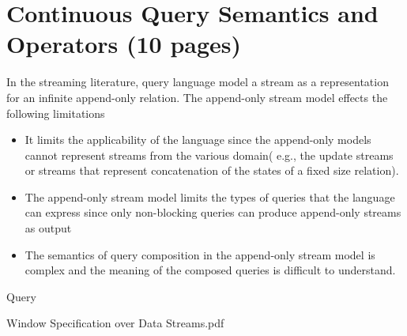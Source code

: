 
\chapter{Continuous Query Semantics and Operators (10 pages)}

\ifpdf
    \graphicspath{{Chapter4/Figs/Raster/}{Chapter4/Figs/PDF/}{Chapter4/Figs/}}
\else
    \graphicspath{{Chapter4/Figs/Vector/}{Chapter4/Figs/}}
\fi

In the streaming literature, query language model a stream as a representation for an infinite append-only relation. The append-only stream model effects the following limitations\citep{Ghanem:2008}
\begin{itemize}
\item It limits the applicability of the language since the append-only models cannot represent streams from the various domain( e.g., the update streams or streams that represent concatenation of the states of a fixed size relation).
\item The append-only stream model limits the types of queries that the language can express since only non-blocking queries can produce append-only streams as output
\item The semantics of query composition in the append-only stream model is complex and the meaning of the composed queries is difficult to understand.
\end{itemize}

Query \citep{Babcok:2002}

Window Specification over Data Streams.pdf
